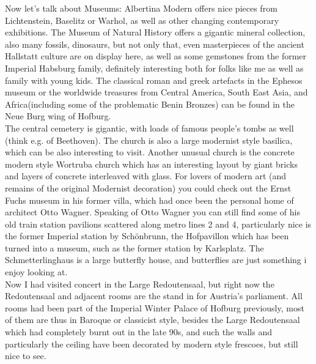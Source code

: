 Now let's talk about Museums: Albertina Modern offers nice pieces from Lichtenstein, Baselitz or Warhol, as well as other  changing contemporary exhibitions. The Museum of Natural History offers a gigantic mineral collection, also many fossils, dinosaurs, but not only that, even masterpieces of the ancient Hallstatt culture are on display here, as well as some gemstones from the former Imperial Habsburg family, definitely interesting both for folks like me as well as family with young kids. The classical roman and greek artefacts in the Ephesos museum or the worldwide treasures from Central America, South East Asia, and Africa(including some of the problematic Benin Bronzes) can be found in the Neue Burg wing of Hofburg. \\
The central cemetery is gigantic, with loads of famous people's tombs as well (think e.g. of Beethoven). The church is also a large modernist style basilica, which can be also interesting to visit. Another unusual church is the concrete modern style Wortruba church which has an interesting layout by giant bricks and layers of concrete interleaved with glass. For lovers of modern art (and remains of the original Modernist decoration) you could check out the Ernst Fuchs museum in his former villa, which had once been the personal home of architect Otto Wagner. Speaking of Otto Wagner you can still find some of his old train station pavilions scattered along metro lines 2 and 4, particularly nice is the former Imperial station by Sch\"onbrunn, the Hofpavillon which has been turned into a museum, such as the former station by Karlsplatz. The Schmetterlinghaus is a large butterfly house, and butterflies are just something i enjoy looking at.\\
Now I had visited concert in the Large Redoutensaal, but right now the Redoutensaal and adjacent rooms are the stand in for Austria's parliament. All rooms had been part of the Imperial Winter Palace of Hofburg previously, most of them are thus in Baroque or classicist style, besides the Large Redoutensaal which had completely burnt out in the late 90s, and such the walls and particularly the ceiling have been decorated by modern style frescoes, but still nice to see.\\

